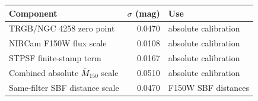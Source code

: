 \begin{tabular}{lrp{4.5cm}}
\toprule
Component & $\sigma$ (mag) & Use \\
\midrule
TRGB/NGC 4258 zero point & 0.0470 & absolute calibration \\
NIRCam F150W flux scale & 0.0108 & absolute calibration \\
STPSF finite-stamp term & 0.0167 & absolute calibration \\
Combined absolute $\overline M_{150}$ scale & 0.0510 & absolute calibration \\
Same-filter SBF distance scale & 0.0470 & F150W SBF distances \\
\bottomrule
\end{tabular}
